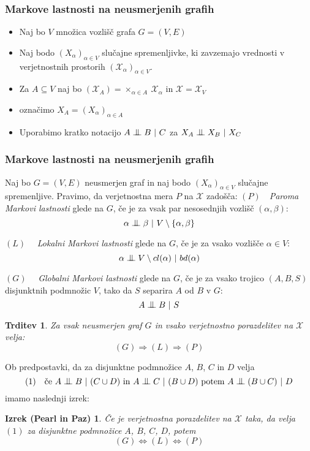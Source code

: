 \documentclass{beamer}
\newtheorem{trditev}[definicija]{Trditev}
\newtheorem{izrek_p_z}[izrek]{Izrek (Pearl in Paz)}
\newcommand{\cond}{\mathrel{\text{\scalebox{1.07}{$\perp\mkern-10mu\perp$}}}}
\begin{document}
\begin{frame}
    \frametitle{Markove lastnosti na neusmerjenih grafih}
    \begin{itemize}
        \item Naj bo $V$ množica vozlišč grafa $G=(V,E)$
        \item Naj bodo $(X_\alpha)_{\alpha \in V}$ slučajne spremenljivke, ki zavzemajo vrednosti
        v verjetnostnih prostorih $(\mathcal{X}_\alpha)_{\alpha \in V}$. 
        \item Za $A \subseteq V$ naj bo $(\mathcal{X}_A) = \times_{\alpha \in A} ~ \mathcal{X}_\alpha$ in $\mathcal{X} = \mathcal{X}_V$
        \item označimo $X_A = (X_\alpha)_{\alpha \in A}$ 
        \item Uporabimo kratko notacijo $A \cond B ~|~ C$ za $X_A \cond X_B ~|~ X_C$
    \end{itemize}
\end{frame}

\begin{frame}
    \frametitle{Markove lastnosti na neusmerjenih grafih}
    Naj bo $G = (V,E)$ neusmerjen graf in naj bodo $ (X_\alpha)_{\alpha \in V} $
    slučajne spremenljive. Pravimo, da verjetnostna mera $P$ na $\mathcal{X}$ zadošča: 
    \newline \newline
    $(P) \quad $\emph{Paroma Markovi lastnosti} glede na $G$, če je za 
    vsak par nesosednjih vozlišč $(\alpha, \beta)$: 
    $$ \alpha \cond \beta ~|~ V \setminus \{\alpha, \beta\}   $$

    $(L) \quad $ \emph{Lokalni Markovi lastnosti} glede na $G$, če je za 
    vsako vozlišče $\alpha \in V$:
    $$ \alpha \cond V \setminus cl(\alpha) ~|~ bd(\alpha) $$ 

    $(G) \quad $ \emph{Globalni Markovi lastnosti} glede na $G$, če je za 
    vsako trojico $(A, B, S)$ disjunktnih podmnožic $V$, tako da $S$ 
    separira $A$ od $B$ v $G$:
    \[ A \cond B ~|~ S \] 

\end{frame}
\begin{frame}
    \begin{trditev}
        Za vsak neusmerjen graf $G$ in vsako verjetnostno porazdelitev na $\mathcal{X}$ velja:
        $$ (G) \Longrightarrow (L) \Longrightarrow (P) $$
    \end{trditev}
    Ob predpostavki, da za disjunktne podmnožice $A$, $B$, $C$ in $D$ velja
    $$(1) \quad \text{če} ~A \cond B ~|~ (C \cup D) ~\text{in}~ A \cond C ~|~ (B \cup D) ~ \text{potem} ~ A \cond (B \cup C) ~|~ D $$
    imamo naslednji izrek:
    \begin{izrek_p_z}
        Če je verjetnostna porazdelitev na $\mathcal{X} $ taka, da velja $(1)$ za disjunktne
        podmnožice $A$, $B$, $C$, $D$, potem 
        $$ (G) \Longleftrightarrow (L) \Longleftrightarrow (P)$$
    \end{izrek_p_z}
\end{frame}
\end{document}
